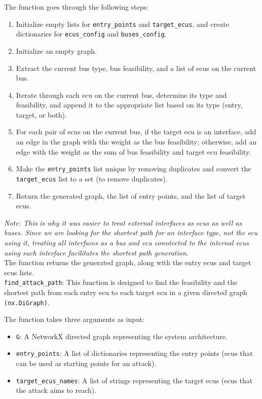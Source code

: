 The function goes through the following steps:
\begin{enumerate}
    \item Initialize empty lists for \texttt{entry\_points} and \texttt{target\_ecus}, 
        and create dictionaries for \texttt{ecus\_config} and \texttt{buses\_config}.
    \item Initialize an empty graph.
    \item Extract the current bus type, bus feasibility, and a list of \acrshort{ecu}s on the current bus.
    \item Iterate through each \acrshort{ecu} on the current bus, determine its type and feasibility, and append it to the 
        appropriate list based on its type (entry, target, or both).
    \item For each pair of \acrshort{ecu}s on the current bus, if the target \acrshort{ecu} is an interface, 
        add an edge in the graph with the weight as the bus feasibility; 
        otherwise, add an edge with the weight as the sum of bus feasibility and target \acrshort{ecu} feasibility.
    \item Make the \texttt{entry\_points} list unique by removing duplicates and convert the \texttt{target\_ecus} list to a set (to remove duplicates).
    \item Return the generated graph, the list of entry points, and the list of target \acrshort{ecu}s.
\end{enumerate}

\textit{Note: This is why it was easier to treat external interfaces as \acrshort{ecu}s as well as buses.
Since we are looking for the shortest path for an interface type, not the \acrshort{ecu} using it, treating all interfaces
as a bus and \acrshort{ecu} conntected to the internal \acrshort{ecu}s using such interface facilitates the shortest path generation.}\\
The function returns the generated graph, along with the entry \acrshort{ecu}s and target \acrshort{ecu}s lists.\\


\texttt{find\_attack\_path}: 
This function is designed to find the feasibility and the shortest path from each entry \acrshort{ecu} 
to each target \acrshort{ecu} in a given directed graph \texttt{(nx.DiGraph)}.

The function takes three arguments as input:
\begin{itemize}
    \item \texttt{G}: A NetworkX directed graph representing the system architecture.
    \item \texttt{entry\_points}: A list of dictionaries representing the entry points (\acrshort{ecu}s that can be used as starting points for an attack).
    \item \texttt{target\_ecus\_names}: A list of strings representing the target \acrshort{ecu}s (\acrshort{ecu}s that the attack aims to reach).
\end{itemize}


